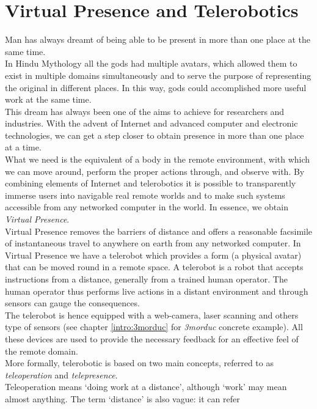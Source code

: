 \section{Virtual Presence and Telerobotics}
\label{intro:virtual_presence}

Man has always dreamt of being able to be present in more than
one place at the same time.
\\
In Hindu Mythology all the gods had multiple avatars, which
allowed them to exist in multiple domains simultaneously and to
serve the purpose of representing the original in different
places. In this way, gods could accomplished more useful work
at the same time. 
\\
This dream has always been one of the aims to achieve for 
researchers and industries. With the advent of Internet and
advanced computer and electronic technologies, we can get a
step closer to obtain presence in more than one place
at a time.
\\
What we need is the equivalent of a body in the remote environment,
with which we can move around, perform the proper actions through,
and observe with. By combining elements of Internet and
telerobotics it is possible to transparently immerse users into
navigable real remote worlds and to make such systems accessible
from any networked computer in the world. In essence, we obtain
\textit{Virtual Presence}.
\\
Virtual Presence removes the barriers of distance and offers a
reasonable facsimile of instantaneous travel to anywhere on earth
from any networked computer.
In Virtual Presence we have a telerobot which provides a form
(a physical avatar) that can be moved round in a remote space.
A telerobot is a robot that accepts instructions from a distance,
generally from a trained human operator. The human operator thus
performs live actions in a distant environment and through sensors
can gauge the consequences.
\\
The telerobot is hence equipped with a web-camera, laser scanning and
others type of sensors (see chapter \ref{intro:3morduc} for \textit{3morduc}
concrete example). All these devices are used to provide the
necessary feedback for an effective feel of the remote domain.
\\
More formally, telerobotic is based on two main concepts, referred to
as \textit{teleoperation} and \textit{telepresence}.
\\
Teleoperation means `doing work at a distance', although `work' may
mean almost anything. The term `distance' is also vague: it can refer
